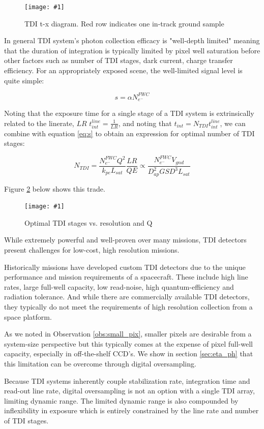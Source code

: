 \documentclass[10pt,journal]{IEEEtran}  %
\newcommand{\includefigure}[3]
{
  \begin{figure}[h!]
  \centering
  \texttt{[image: \#1]}
  \caption[]{#3}
  \label{#2}
  \end{figure}
}
\begin{document}
\includefigure{figures/tdi.pgf}{fig:tdi}{TDI t-x diagram.  Red row indicates one in-track ground sample}

In general TDI system's photon collection efficacy is "well-depth limited" meaning that the duration of integration is typically limited by pixel well saturation before other factors such as number of TDI stages, dark current, charge transfer efficiency.  For an appropriately exposed scene, the well-limited signal level is quite simple:

\begin{equation}
s = \alpha N_{e^-}^{FWC}
\label{eq:well_limited}
\end{equation}

Noting that the exposure time for a single stage of a TDI system is extrinsically related to the linerate, $LR$ $t_{int}^{line} = \frac{1}{LR}$, and noting that $t_{int} = N_{TDI}t_{int}^{line}$, we can combine with equation \ref{eq:s} to obtain an expression for optimal number of TDI stages:

\begin{equation}
N_{TDI} =\frac{N_{e^-}^{FWC} Q^2}{k_{pe} L_{sat}}\frac{LR}{QE} \propto \frac{N_{e^-}^{FWC}V_{gnd}}{D_{ap}^2 GSD^3 L_{sat}}
\label{eq:n_tdi}
\end{equation}

Figure \ref{fig:n_tdi} below shows this trade.

\includefigure{figures/N_tdi.pgf}{fig:n_tdi}{Optimal TDI stages vs. resolution and Q}

While extremely powerful and well-proven over many missions, TDI detectors present challenges for low-cost, high resolution missions.

Historically missions have developed custom TDI detectors due to the unique performance and mission requirements of a spacecraft\cite{jerram}.  These include high line rates, large full-well capacity, low read-noise, high quantum-efficiency and radiation tolerance.  And while there are commercially available TDI detectors, they typically do not meet the requirements of high resolution collection from a space platform.

As we noted in Observation \ref{obs:small_pix}, smaller pixels are desirable from a system-size perspective but this typically comes at the expense of pixel full-well capacity, especially in off-the-shelf CCD's.  We show in section \ref{sec:eta_ph} that this limitation can be overcome through digital oversampling. 

Because TDI systems inherently couple stabilization rate, integration time and read-out line rate, digital oversampling is not an option with a single TDI array, limiting dynamic range.  The limited dynamic range is also compounded by inflexibility in exposure which is entirely constrained by the line rate and number of TDI stages.  
\end{document}
